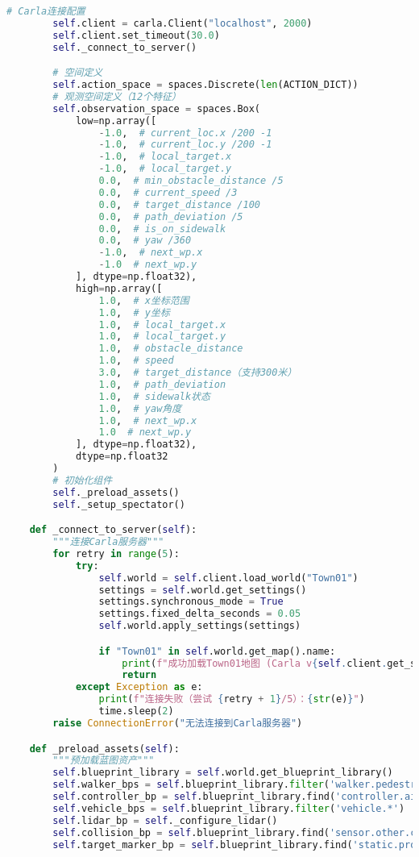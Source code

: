 \begin{lstlisting}[language=Python]
        # Carla连接配置
        self.client = carla.Client("localhost", 2000)
        self.client.set_timeout(30.0)
        self._connect_to_server()

        # 空间定义
        self.action_space = spaces.Discrete(len(ACTION_DICT))
        # 观测空间定义（12个特征）
        self.observation_space = spaces.Box(
            low=np.array([
                -1.0,  # current_loc.x /200 -1
                -1.0,  # current_loc.y /200 -1
                -1.0,  # local_target.x
                -1.0,  # local_target.y
                0.0,  # min_obstacle_distance /5
                0.0,  # current_speed /3
                0.0,  # target_distance /100
                0.0,  # path_deviation /5
                0.0,  # is_on_sidewalk
                0.0,  # yaw /360
                -1.0,  # next_wp.x
                -1.0  # next_wp.y
            ], dtype=np.float32),
            high=np.array([
                1.0,  # x坐标范围
                1.0,  # y坐标
                1.0,  # local_target.x
                1.0,  # local_target.y
                1.0,  # obstacle_distance
                1.0,  # speed
                3.0,  # target_distance（支持300米）
                1.0,  # path_deviation
                1.0,  # sidewalk状态
                1.0,  # yaw角度
                1.0,  # next_wp.x
                1.0  # next_wp.y
            ], dtype=np.float32),
            dtype=np.float32
        )
        # 初始化组件
        self._preload_assets()
        self._setup_spectator()

    def _connect_to_server(self):
        """连接Carla服务器"""
        for retry in range(5):
            try:
                self.world = self.client.load_world("Town01")
                settings = self.world.get_settings()
                settings.synchronous_mode = True
                settings.fixed_delta_seconds = 0.05
                self.world.apply_settings(settings)

                if "Town01" in self.world.get_map().name:
                    print(f"成功加载Town01地图 (Carla v{self.client.get_server_version()})")
                    return
            except Exception as e:
                print(f"连接失败（尝试 {retry + 1}/5）：{str(e)}")
                time.sleep(2)
        raise ConnectionError("无法连接到Carla服务器")

    def _preload_assets(self):
        """预加载蓝图资产"""
        self.blueprint_library = self.world.get_blueprint_library()
        self.walker_bps = self.blueprint_library.filter('walker.pedestrian.*')
        self.controller_bp = self.blueprint_library.find('controller.ai.walker')
        self.vehicle_bps = self.blueprint_library.filter('vehicle.*')
        self.lidar_bp = self._configure_lidar()
        self.collision_bp = self.blueprint_library.find('sensor.other.collision')
        self.target_marker_bp = self.blueprint_library.find('static.prop.streetbarrier')


\end{lstlisting}
